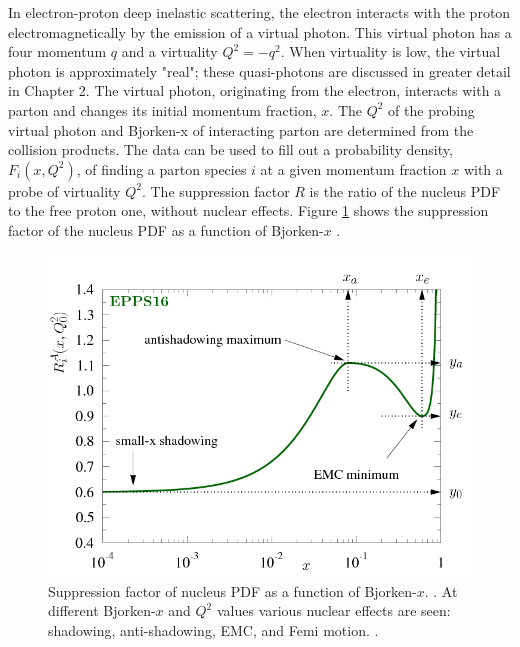 In electron-proton deep inelastic scattering, the electron interacts with the proton electromagnetically by the emission of a virtual photon. This virtual photon has a four momentum $q$ and a virtuality $Q^2 = - q^2$. When virtuality is low, the virtual photon is approximately "real"; these quasi-photons are discussed in greater detail in Chapter 2. The virtual photon, originating from the electron, interacts with a parton and changes its initial momentum fraction, $x$. The $Q^2$ of the probing virtual photon and Bjorken-x of interacting parton are determined from the collision products. The data can be used to fill out a probability density, $F_i(x, Q^2)$, of finding a parton species $i$ at a given momentum fraction $x$ with a probe of virtuality $Q^2$. The suppression factor $R$ is the ratio of the nucleus PDF to the free proton one, without nuclear effects. Figure \ref{fig:f2Supp} shows the suppression factor of the nucleus PDF as a function of Bjorken-$x$ \cite{Paakkinen:2018zbs}.

\begin{figure}[h!]
\begin{centering}
\includegraphics[width=5in]{Chapter1/importfigs/FitForm_EPPS16.png}
\par\end{centering}
\caption{Suppression factor of nucleus PDF as a function of Bjorken-$x$. . At different Bjorken-$x$ and $Q^{2}$ values various nuclear effects are seen: shadowing, anti-shadowing, EMC, and Femi motion. \cite{Paakkinen:2018zbs}. \label{fig:f2Supp}}
\end{figure}

